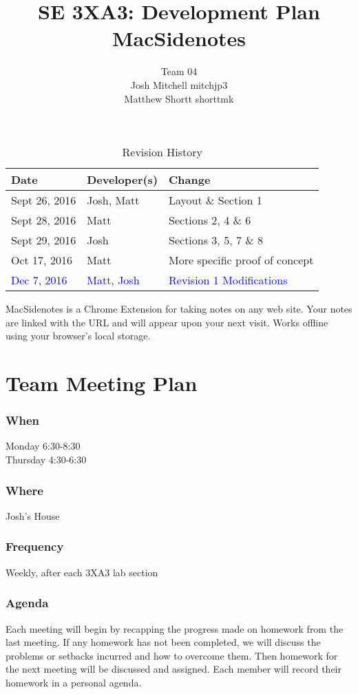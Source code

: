 \documentclass{article}
\title{SE 3XA3: Development Plan\\MacSidenotes}
\author{Team 04
	\\ Josh Mitchell mitchjp3
	\\ Matthew Shortt shorttmk
}
\date{}
\begin{document}
	
	\begin{table}[hp]
		\caption{Revision History} \label{TblRevisionHistory}
		\begin{tabularx}{\textwidth}{llX}
			\toprule
			\textbf{Date} & \textbf{Developer(s)} & \textbf{Change}\\
			\midrule
			Sept 26, 2016 & Josh, Matt & Layout \& Section 1\\
			Sept 28, 2016 & Matt & Sections 2, 4 \& 6\\
			Sept 29, 2016 & Josh & Sections 3, 5, 7 \& 8\\
			Oct 17, 2016 & Matt & More specific proof of concept\\
			\textcolor{blue}{Dec 7, 2016} & \textcolor{blue}{Matt, Josh} & 
			\textcolor{blue}{Revision 1 Modifications}\\
			\bottomrule
		\end{tabularx}
	\end{table}
	
	\newpage
	
	\maketitle
	
	MacSidenotes is a Chrome Extension for taking notes on any web site. Your 
	notes are linked with the URL and will appear upon your next visit. Works 
	offline using your browser's local storage.
	
	\section{Team Meeting Plan}
	\subsubsection*{When}
	Monday 6:30-8:30 \\
	Thursday 4:30-6:30
	\subsubsection*{Where}
	Josh's House
	\subsubsection*{Frequency}
	Weekly, after each 3XA3 lab section
	\subsubsection*{Agenda}
	Each meeting will begin by recapping the progress made on homework from the 
	last meeting. If any homework has not been completed, we will discuss the 
	problems or setbacks incurred and how to overcome them. Then homework for 
	the next meeting will be discussed and assigned. Each member will record 
	their 
	homework in a personal agenda.
	
\end{document}
